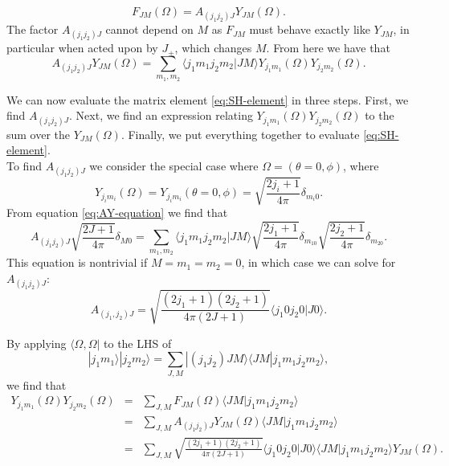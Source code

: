 \documentclass{article}
\theoremstyle{definition}
\newcommand{\nn}{\nonumber}
\newcommand{\f}[2]{\frac{#1}{#2}}
\begin{document}
\begin{equation}
F_{JM}(\Omega) = A_{(j_1j_2)J} Y_{JM}(\Omega). 
\end{equation}
The factor $A_{(j_1j_2)J}$ cannot depend on $M$ as $F_{JM}$ must behave exactly like $Y_{JM}$, in particular when acted upon by $J_{\pm}$, which changes $M$. From here we have that
\begin{equation}\label{eq:AY-equation}
A_{(j_1j_2)J} Y_{JM}(\Omega) = \sum_{m_1,m_2}  \langle j_1m_1j_2m_2 | JM\rangle Y_{j_1m_1}(\Omega) Y_{j_2m_2}(\Omega).
\end{equation}

\noindent We can now evaluate the matrix element \eqref{eq:SH-element} in three steps. First, we find $A_{(j_1 j_2) J}$. Next, we find an expression relating 
$Y_{j_1m_1} (\Omega) Y_{j_2 m_2} (\Omega)$ 
to the sum over the $Y_{JM}(\Omega)$. Finally, we put everything together to evaluate \eqref{eq:SH-element}.  \\

\noindent To find $A_{(j_1j_2)J}$ we consider the special case where $\Omega = (\theta=0,\phi)$, where
\begin{equation}
Y_{j_im_i}(\Omega) = Y_{j_im_i}(\theta=0,\phi) = \sqrt{\f{2j_i+1}{4\pi}} \delta_{m_i0}.
\end{equation}
From equation \eqref{eq:AY-equation} we find that
\begin{equation}
A_{(j_1j_2)J} \sqrt{\f{2J+1}{4\pi}} \delta_{M0} = \sum_{m_1,m_2}  \langle j_1m_1j_2m_2 | JM\rangle \sqrt{\f{2j_1+1}{4\pi}} \delta_{m_10} \sqrt{\f{2j_2+1}{4\pi}} \delta_{m_20}.
\end{equation}
This equation is nontrivial if $M=m_1=m_2 = 0$, in which case we can solve for $A_{(j_1j_2)J}$:
\begin{equation}
A_{(j_1,j_2)J} =   \sqrt{\f{(2j_1+1)(2j_2+1)}{4\pi(2J+1)}} \langle j_1 0 j_2 0 | J 0  \rangle.
\end{equation}

\noindent By applying $\langle \Omega,\Omega|$ to the LHS of 
\begin{equation}
|j_1m_1\rangle | j_2m_2\rangle = \sum_{J,M} |(j_1j_2)JM\rangle \langle JM| j_1m_1j_2m_2\rangle,
\end{equation}
we find that
\begin{eqnarray}
{Y_{j_1m_1} (\Omega) Y_{j_2m_2} (\Omega) }
&=& \sum_{J,M} F_{JM}(\Omega) \langle JM| j_1m_1j_2m_2\rangle \nn \\
&=& \sum_{J,M} A_{(j_1j_2)J} Y_{JM}(\Omega) \langle JM| j_1m_1j_2m_2\rangle \nn \\
&=& {\sum_{J,M} \sqrt{\f{(2j_1+1)(2j_2+1)}{4\pi(2J+1)}} \langle j_1 0 j_2 0 | J 0  \rangle  \langle JM| j_1m_1j_2m_2\rangle Y_{JM}(\Omega)}.
\end{eqnarray}
\end{document}
